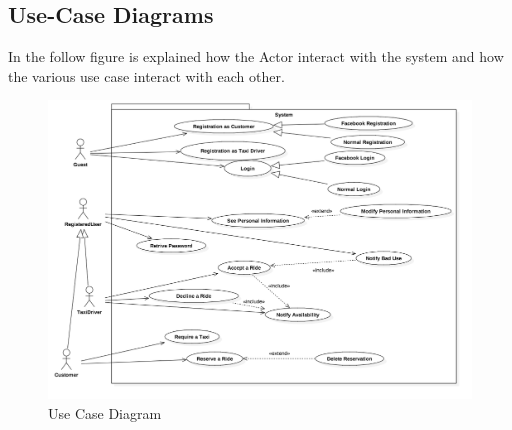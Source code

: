 \subsection{Use-Case Diagrams}
	In the follow figure is explained how the Actor interact with the system and how the various use case interact with each other.


				\begin{figure}[H]
					\centering
					\includegraphics[width=\textwidth, scale=0.5]{IMG/UseCaseDiagram.png}
					\caption{Use Case Diagram}\label{sec:UseCaseDiagramFigure}
				\end{figure}
				
				
